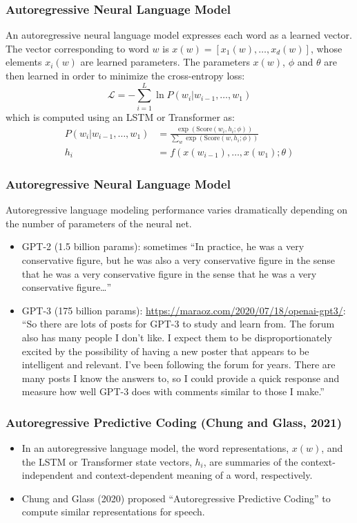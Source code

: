 \documentclass{beamer}
\begin{document}
\begin{frame}
  \frametitle{Autoregressive Neural Language Model}

  An autoregressive neural language model expresses each word as a
  learned vector.  The vector corresponding to word $w$ is
  $x(w)=[x_1(w),\ldots,x_d(w)]$, whose elements $x_i(w)$ are learned
  parameters.  The parameters $x(w)$, $\phi$ and $\theta$ are then
  learned in order to minimize the cross-entropy loss:
  \begin{displaymath}
    {\mathcal L}=-\sum_{i=1}^L \ln P(w_i|w_{i-1},\ldots,w_1)
  \end{displaymath}
  which is computed using an LSTM or Transformer as:
  \begin{align*}
    P(w_i|w_{i-1},\ldots,w_1) &= \frac{\exp\left(\text{Score}(w_i,h_i;\phi)\right)}{\sum_w \exp\left(\text{Score}(w,h_i;\phi)\right)} \\
    h_i &= f\left(x(w_{i-1}),\ldots,x(w_1);\theta\right)
  \end{align*}
\end{frame}

\begin{frame}
  \frametitle{Autoregressive Neural Language Model}

  Autoregressive language modeling performance varies dramatically
  depending on the number of parameters of the neural net.

  \begin{itemize}
  \item GPT-2 (1.5 billion params): sometimes ``In practice, he was a
    very conservative figure, but he was also a very conservative
    figure in the sense that he was a very conservative figure in the
    sense that he was a very conservative figure\ldots''
  \item GPT-3 (175 billion params): \url{https://maraoz.com/2020/07/18/openai-gpt3/}:
``So there are lots of posts for GPT-3 to study and learn
    from. The forum also has many people I don’t like. I expect them
    to be disproportionately excited by the possibility of having a
    new poster that appears to be intelligent and relevant. I’ve
    been following the forum for years. There are many posts I know
    the answers to, so I could provide a quick response and measure
    how well GPT-3 does with comments similar to those I make.''
  \end{itemize}
\end{frame}

\begin{frame}
  \frametitle{Autoregressive Predictive Coding (Chung and Glass, 2021)}

  \begin{itemize}
  \item In an autoregressive language model, the word representations,
    $x(w)$, and the LSTM or Transformer state vectors, $h_i$, are
    summaries of the context-independent and context-dependent meaning
    of a word, respectively.
  \item Chung and Glass (2020) proposed ``Autoregressive Predictive
    Coding'' to compute similar representations for speech.
  \end{itemize}
\end{frame}
\end{document}
